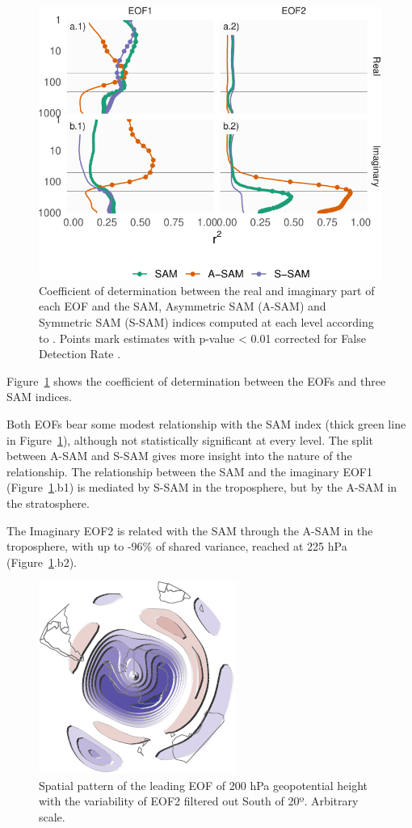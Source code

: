 \documentclass[smallextended]{svjour3}       %
\begin{document}
\begin{figure}
\centering
\includegraphics{../figures/sam-eof-vertical-1.pdf}
\caption{\label{fig:sam-eof-vertical}Coefficient of determination between the real and imaginary part of each EOF and the SAM, Asymmetric SAM (A-SAM) and Symmetric SAM (S-SAM) indices computed at each level according to \citet{campitelli2021}. Points mark estimates with p-value \textless{} 0.01 corrected for False Detection Rate \citep{benjamini1995}.}
\end{figure}

Figure~\ref{fig:sam-eof-vertical} shows the coefficient of determination between the EOFs and three SAM indices.

Both EOFs bear some modest relationship with the SAM index (thick green line in Figure~\ref{fig:sam-eof-vertical}), although not statistically significant at every level. The split between A-SAM and S-SAM gives more insight into the nature of the relationship. The relationship between the SAM and the imaginary EOF1 (Figure~\ref{fig:sam-eof-vertical}.b1) is mediated by S-SAM in the troposphere, but by the A-SAM in the stratosphere.

The Imaginary EOF2 is related with the SAM through the A-SAM in the troposphere, with up to -96\% of shared variance, reached at 225 hPa (Figure~\ref{fig:sam-eof-vertical}.b2).

\begin{figure}
\centering
\includegraphics{../figures/eof-filtered-1.pdf}
\caption{\label{fig:eof-filtered}Spatial pattern of the leading EOF of 200 hPa geopotential height with the variability of EOF2 filtered out South of 20º. Arbitrary scale.}
\end{figure}
\end{document}
